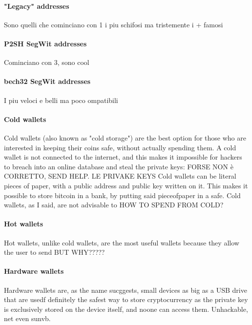 \documentclass {article}
\begin{document}
\paragraph {"Legacy" addresses}


Sono quelli che cominciano con 1 i piu schifosi ma tristemente i + famosi


\paragraph {P2SH SegWit addresses}


Cominciano con 3, sono cool


\paragraph {bech32 SegWit addresses}


I piu veloci e belli ma poco ompatibili


\paragraph {Cold wallets}


Cold wallets (also known as "cold storage") are the best option for those who are interested in keeping their coins safe, without actually spending them.
A cold wallet is not connected to the internet, and this makes it impossible for hackers to breach into an online database and steal the private keys: FORSE NON è CORRETTO, SEND HELP. LE PRIVAKE KEYS 
Cold wallets can be literal pieces of paper, with a public address and public key written on it. This makes it possible to store bitcoin in a bank, by putting said pieceofpaper in a safe.
Cold wallets, as I said, are not advisable to HOW TO SPEND FROM COLD?


\paragraph {Hot wallets}


Hot wallets, unlike cold wallets, are the most useful wallets because they allow the user to send BUT WHY?????


\paragraph {Hardware wallets}


Hardware wallets are, as the name sucggests, small devices as big as a USB drive that are usedf
definitely the safest way to store cryptocurrency as the private key is exclusively stored on the device itself, and noone can access them. Unhackable, net even sunvb.
\end{document}
